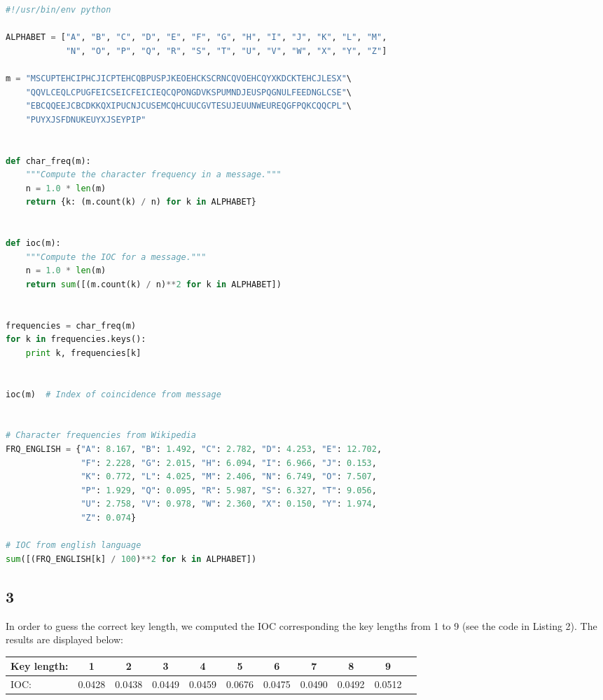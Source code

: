 \documentclass[12pt]{article}
\begin{document}
\begin{lstlisting}[language=Python, caption=Code for answering problem 2.A]
#!/usr/bin/env python

ALPHABET = ["A", "B", "C", "D", "E", "F", "G", "H", "I", "J", "K", "L", "M",
            "N", "O", "P", "Q", "R", "S", "T", "U", "V", "W", "X", "Y", "Z"]

m = "MSCUPTEHCIPHCJICPTEHCQBPUSPJKEOEHCKSCRNCQVOEHCQYXKDCKTEHCJLESX"\
    "QQVLCEQLCPUGFEICSEICFEICIEQCQPONGDVKSPUMNDJEUSPQGNULFEEDNGLCSE"\
    "EBCQQEEJCBCDKKQXIPUCNJCUSEMCQHCUUCGVTESUJEUUNWEUREQGFPQKCQQCPL"\
    "PUYXJSFDNUKEUYXJSEYPIP"


def char_freq(m):
    """Compute the character frequency in a message."""
    n = 1.0 * len(m)
    return {k: (m.count(k) / n) for k in ALPHABET}


def ioc(m):
    """Compute the IOC for a message."""
    n = 1.0 * len(m)
    return sum([(m.count(k) / n)**2 for k in ALPHABET])


frequencies = char_freq(m)
for k in frequencies.keys():
    print k, frequencies[k]


ioc(m)  # Index of coincidence from message


# Character frequencies from Wikipedia
FRQ_ENGLISH = {"A": 8.167, "B": 1.492, "C": 2.782, "D": 4.253, "E": 12.702,
               "F": 2.228, "G": 2.015, "H": 6.094, "I": 6.966, "J": 0.153,
               "K": 0.772, "L": 4.025, "M": 2.406, "N": 6.749, "O": 7.507,
               "P": 1.929, "Q": 0.095, "R": 5.987, "S": 6.327, "T": 9.056,
               "U": 2.758, "V": 0.978, "W": 2.360, "X": 0.150, "Y": 1.974,
               "Z": 0.074}

# IOC from english language
sum([(FRQ_ENGLISH[k] / 100)**2 for k in ALPHABET])  
\end{lstlisting}


\newpage


\subsection*{3}

In order to guess the correct key length, we computed the IOC corresponding the key lengths from 1 to 9 (see the code in Listing 2). The results are displayed below:

\begin{table}[h!]
  \centering
  \begin{tabular}{l|c|c|c|c|c|c|c|c|c|c}
    Key length: & 1 & 2 & 3 & 4 & 5 & 6 & 7 & 8 & 9 \\
    \hline
    IOC: & 0.0428 & 0.0438 & 0.0449 & 0.0459 & 0.0676 & 0.0475 & 0.0490 & 0.0492 & 0.0512 \\
  \end{tabular}
\end{table}
\end{document}
